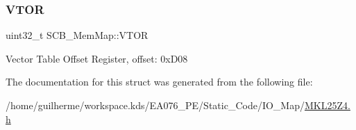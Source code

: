 \subsubsection{\texorpdfstring{V\+T\+OR}{VTOR}}
{\footnotesize\ttfamily uint32\+\_\+t S\+C\+B\+\_\+\+Mem\+Map\+::\+V\+T\+OR}

Vector Table Offset Register, offset\+: 0x\+D08 

The documentation for this struct was generated from the following file\+:\begin{DoxyCompactItemize}
\item 
/home/guilherme/workspace.\+kds/\+E\+A076\+\_\+\+P\+E/\+Static\+\_\+\+Code/\+I\+O\+\_\+\+Map/\hyperlink{_m_k_l25_z4_8h}{M\+K\+L25\+Z4.\+h}\end{DoxyCompactItemize}
